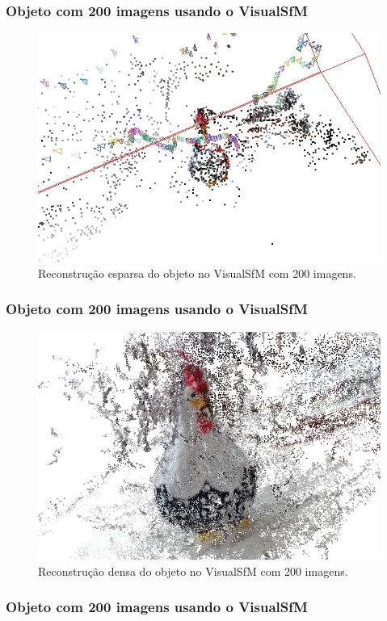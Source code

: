 \documentclass[table, usenames, svgnames, xcolor=dvipsnames]{beamer}
\begin{document}
\begin{frame}
\frametitle{\textbf{Objeto com 200 imagens usando o VisualSfM}}
	\begin{figure}[!h]
		\centering
		\includegraphics[width=0.8\linewidth]{figs/galinhasparsa.jpg}
		\caption{%
		Reconstrução esparsa do objeto no VisualSfM com 200 imagens.
		}
	\end{figure}
\end{frame}

\begin{frame}
\frametitle{\textbf{Objeto com 200 imagens usando o VisualSfM}}
	\begin{figure}[!h]
		\centering
		\includegraphics[width=0.8\linewidth]{figs/galinhadense.jpg}
		\caption{%
		Reconstrução densa do objeto no VisualSfM com 200 imagens.
		}
	\end{figure}
\end{frame}

\begin{frame}
\frametitle{\textbf{Objeto com 200 imagens usando o VisualSfM}}

	\begin{center}
	\end{center}
\end{frame}
\end{document}
